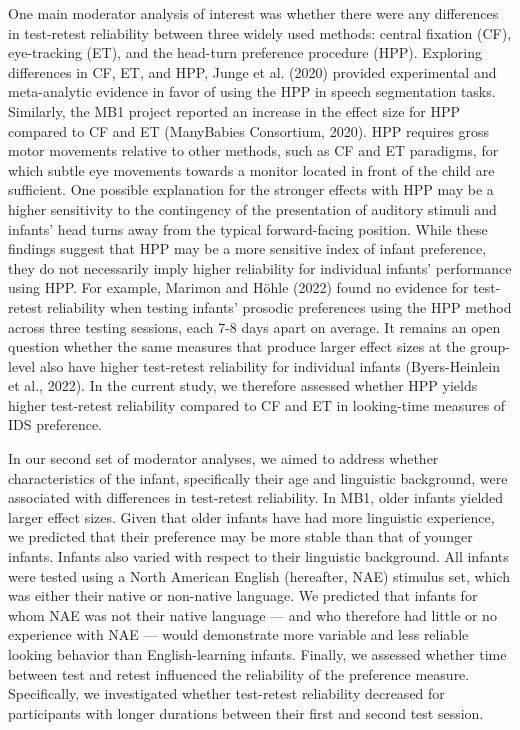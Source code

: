 \documentclass[
  man,floatsintext]{apa6}
\begin{document}
One main moderator analysis of interest was whether there were any differences in test-retest reliability between three widely used methods: central fixation (CF), eye-tracking (ET), and the head-turn preference procedure (HPP).
Exploring differences in CF, ET, and HPP, Junge et al. (2020) provided experimental and meta-analytic evidence in favor of using the HPP in speech segmentation tasks.
Similarly, the MB1 project reported an increase in the effect size for HPP compared to CF and ET (ManyBabies Consortium, 2020).
HPP requires gross motor movements relative to other methods, such as CF and ET paradigms, for which subtle eye movements towards a monitor located in front of the child are sufficient.
One possible explanation for the stronger effects with HPP may be a higher sensitivity to the contingency of the presentation of auditory stimuli and infants' head turns away from the typical forward-facing position.
While these findings suggest that HPP may be a more sensitive index of infant preference, they do not necessarily imply higher reliability for individual infants' performance using HPP.
For example, Marimon and Höhle (2022) found no evidence for test-retest reliability when testing infants' prosodic preferences using the HPP method across three testing sessions, each 7-8 days apart on average.
It remains an open question whether the same measures that produce larger effect sizes at the group-level also have higher test-retest reliability for individual infants (Byers-Heinlein et al., 2022).
In the current study, we therefore assessed whether HPP yields higher test-retest reliability compared to CF and ET in looking-time measures of IDS preference.

In our second set of moderator analyses, we aimed to address whether characteristics of the infant, specifically their age and linguistic background, were associated with differences in test-retest reliability.
In MB1, older infants yielded larger effect sizes.
Given that older infants have had more linguistic experience, we predicted that their preference may be more stable than that of younger infants.
Infants also varied with respect to their linguistic background.
All infants were tested using a North American English (hereafter, NAE) stimulus set, which was either their native or non-native language.
We predicted that infants for whom NAE was not their native language --- and who therefore had little or no experience with NAE --- would demonstrate more variable and less reliable looking behavior than English-learning infants.
Finally, we assessed whether time between test and retest influenced the reliability of the preference measure.
Specifically, we investigated whether test-retest reliability decreased for participants with longer durations between their first and second test session.
\end{document}
